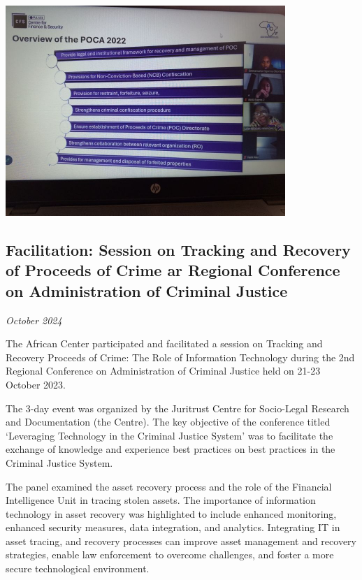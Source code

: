 \documentclass[
  letterpaper,
  DIV=11,
  numbers=noendperiod]{scrreprt}
\begin{document}
\begin{center}
\includegraphics[width=4.16667in,height=\textheight,keepaspectratio]{images/return/07_01_poca.png}
\end{center}

\subsection{Facilitation: Session on Tracking and Recovery of Proceeds
of Crime ar Regional Conference on Administration of Criminal
Justice}\label{facilitation-session-on-tracking-and-recovery-of-proceeds-of-crime-ar-regional-conference-on-administration-of-criminal-justice}

\emph{October 2024}

The African Center participated and facilitated a session on Tracking
and Recovery Proceeds of Crime: The Role of Information Technology
during the 2nd Regional Conference on Administration of Criminal Justice
held on 21-23 October 2023.

The 3-day event was organized by the Juritrust Centre for Socio-Legal
Research and Documentation (the Centre). The key objective of the
conference titled `Leveraging Technology in the Criminal Justice System'
was to facilitate the exchange of knowledge and experience best
practices on best practices in the Criminal Justice System.

The panel examined the asset recovery process and the role of the
Financial Intelligence Unit in tracing stolen assets. The importance of
information technology in asset recovery was highlighted to include
enhanced monitoring, enhanced security measures, data integration, and
analytics. Integrating IT in asset tracing, and recovery processes can
improve asset management and recovery strategies, enable law enforcement
to overcome challenges, and foster a more secure technological
environment.
\end{document}

